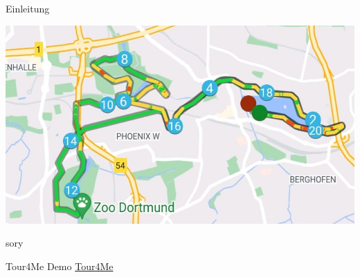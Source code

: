 \documentclass[aspectratio=169,xcolor=dvipsnames, t]{beamer}
\begin{document}
\begin{frame}{Einleitung}
\begin{minipage}[t][0.7\textheight][b]{0.48\textwidth}
{\begin{flushright}
				\end{flushright}
				\begin{flushleft}
					\includegraphics[height=0.3\textheight]{images/laufstrecke_komplex.jpg}
				\end{flushleft}}
		\end{minipage}
sory 	\end{frame}
	
	\begin{frame}{Tour4Me Demo}
	\centering
	\vspace{2cm}
	\Huge \href{http://tour4me.cs.tu-dortmund.de/} {Tour4Me}
	\end{frame}
	
\end{document}
